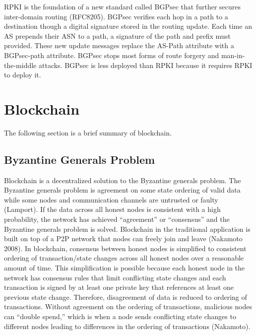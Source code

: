 \documentclass[letterpaper, 10 pt, conference]{ieeeconf}  %
\begin{document}
RPKI is the foundation of a new standard called BGPsec that further secures inter-domain routing (RFC8205). BGPsec verifies each hop in a path to a destination though a digital signature stored in the routing update. Each time an AS prepends their ASN to a path, a signature of the path and prefix must provided. These new update messages replace the AS-Path attribute with a BGPsec-path attribute. BGPsec stops most forms of route forgery and man-in-the-middle attacks. BGPsec is less deployed than RPKI because it requires RPKI to deploy it.


\section{Blockchain}
The following section is a brief summary of blockchain.

\subsection{Byzantine Generals Problem} 

Blockchain is a decentralized solution to the Byzantine generals problem. The Byzantine generals problem is agreement on some state ordering of valid data while some nodes and communication channels are untrusted or faulty (Lamport). If the data across all honest nodes is consistent with a high probability, the network has achieved “agreement” or “consensus” and the Byzantine generals problem is solved. Blockchain in the traditional application is built on top of a P2P network that nodes can freely join and leave (Nakamoto 2008). In blockchain, consensus between honest nodes is simplified to consistent ordering of transaction/state changes across all honest nodes over a reasonable amount of time. This simplification is possible because each honest node in the network has consensus rules that limit conflicting state changes and each transaction is signed by at least one private key that references at least one previous state change. Therefore, disagreement of data is reduced to ordering of transactions. Without agreement on the ordering of transactions, malicious nodes can “double spend,” which is when a node sends conflicting state changes to different nodes leading to differences in the
ordering of transactions (Nakamoto).
\end{document}

